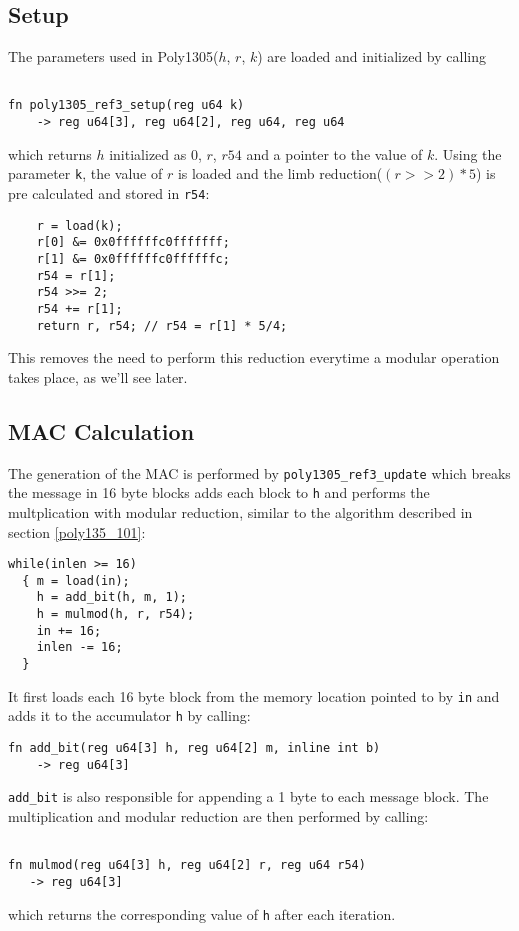 \documentclass[twocolumn]{article}
\begin{document}
\subsection{Setup}
The parameters used in Poly1305($h$, $r$, $k$) are loaded and initialized by calling 

\begin{Verbatim}[fontsize=\footnotesize]

fn poly1305_ref3_setup(reg u64 k) 
    -> reg u64[3], reg u64[2], reg u64, reg u64

\end{Verbatim}

which returns $h$ initialized as 0, $r$, $r54$ and a pointer to the value of $k$.
Using the parameter \texttt{k}, the value of $r$ is loaded and the limb reduction($(r>>2)*5$) is pre calculated and stored in \texttt{r54}:
\begin{verbatim}
    r = load(k);
    r[0] &= 0x0ffffffc0fffffff;
    r[1] &= 0x0ffffffc0ffffffc;
    r54 = r[1];
    r54 >>= 2;
    r54 += r[1];
    return r, r54; // r54 = r[1] * 5/4;
\end{verbatim}
This removes the need to perform this reduction everytime a modular operation takes place, as we'll see later.

\subsection{MAC Calculation}
The generation of the MAC is performed by \texttt{poly1305\_ref3\_update} which breaks the message in 16 byte blocks adds each block to \texttt{h} and performs
the multplication with modular reduction, similar to the algorithm described in section \ref{poly135_101}:
\begin{verbatim}
while(inlen >= 16)
  { m = load(in);
    h = add_bit(h, m, 1);
    h = mulmod(h, r, r54);
    in += 16;
    inlen -= 16;
  }
\end{verbatim}

It first loads each 16 byte block from the memory location pointed to by \texttt{in} and adds it to the accumulator \texttt{h} by calling: 
\begin{Verbatim}[fontsize=\footnotesize]
fn add_bit(reg u64[3] h, reg u64[2] m, inline int b) 
    -> reg u64[3]
\end{Verbatim}

\texttt{add\_bit} is also responsible for appending a 1 byte to each message block. The multiplication and modular reduction are then performed by calling:
\begin{Verbatim}[fontsize=\footnotesize]

fn mulmod(reg u64[3] h, reg u64[2] r, reg u64 r54) 
   -> reg u64[3]

\end{Verbatim}
which returns the corresponding value of \texttt{h} after each iteration.
\end{document}
